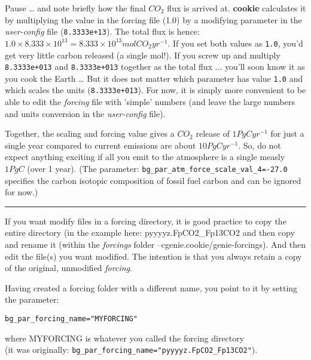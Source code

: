 \vspace{1mm}

Pause … and note briefly how the final \(CO_{2}\) flux is arrived at. \textbf{cookie} calculates it by multiplying the value in the forcing file (1.0) by a modifying parameter in the \textit{user-config} file (\texttt{8.3333e+13}). The total flux is hence: \(1.0 \times 8.333\times10^{13} = 8.333\times10^{13} mol CO_{2} yr^{-1}\). If you set both values as \texttt{1.0}, you’d get very little carbon released (a single mol!). If you screw up and multiply \texttt{8.3333e+013} and \texttt{8.3333e+013} together as the total flux ... you’ll soon know it as you cook the Earth … But it does not matter which parameter has value \texttt{1.0} and which scales the units (\texttt{8.3333e+013}). For now, it is simply more convenient to be able to edit the \textit{forcing} file with 'simple' numbers (and leave the large numbers and units conversion in the \textit{user-config} file).

Together, the scaling and forcing value gives a \(CO_{2}\) release of \(1 PgC yr^{-1}\) for just a single year compared to current emissions are about \(10 PgC yr^{-1}\). So, do not expect anything exciting if all you emit to the atmosphere is a single measly \(1 PgC\) (over 1 year). (The parameter: \texttt{\small bg\_par\_atm\_force\_scale\_val\_4=-27.0} specifies the carbon isotopic composition of fossil fuel carbon and can be ignored for now.)

\vspace{1mm} \noindent\rule{4cm}{0.1mm} \vspace{2mm}

\noindent If you want modify files in a forcing directory, it is good practice to copy the entire directory (in the example here: \textsf{\footnotesize pyyyyz.FpCO2\_Fp13CO2} and then copy and rename it (within the \textit{forcings} folder --\textsf{\footnotesize cgenie.cookie/genie-forcings}). And then edit the file(s) you want modified. The intention is that you always retain a copy of the original, unmodified \textit{forcing}.

Having created a forcing folder with a different name, you point to it by setting the parameter:

\vspace{-2pt}\footnotesize\begin{verbatim}
bg_par_forcing_name="MYFORCING"
\end{verbatim}\normalsize\vspace{-2pt}
where \textsf{\footnotesize MYFORCING} is whatever you called the forcing directory\\(it was originally: \texttt{\footnotesize bg\_par\_forcing\_name="pyyyyz.FpCO2\_Fp13CO2"}).

